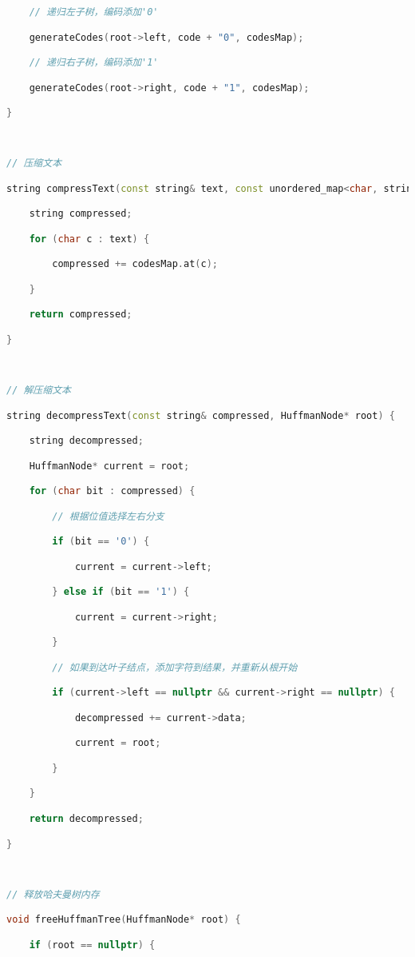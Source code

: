 \begin{lstlisting}[language=C++]
    // 递归左子树，编码添加'0'

    generateCodes(root->left, code + "0", codesMap);

    // 递归右子树，编码添加'1'

    generateCodes(root->right, code + "1", codesMap);

}

  

// 压缩文本

string compressText(const string& text, const unordered_map<char, string>& codesMap) {

    string compressed;

    for (char c : text) {

        compressed += codesMap.at(c);

    }

    return compressed;

}

  

// 解压缩文本

string decompressText(const string& compressed, HuffmanNode* root) {

    string decompressed;

    HuffmanNode* current = root;

    for (char bit : compressed) {

        // 根据位值选择左右分支

        if (bit == '0') {

            current = current->left;

        } else if (bit == '1') {

            current = current->right;

        }

        // 如果到达叶子结点，添加字符到结果，并重新从根开始

        if (current->left == nullptr && current->right == nullptr) {

            decompressed += current->data;

            current = root;

        }

    }

    return decompressed;

}

  

// 释放哈夫曼树内存

void freeHuffmanTree(HuffmanNode* root) {

    if (root == nullptr) {


\end{lstlisting}
